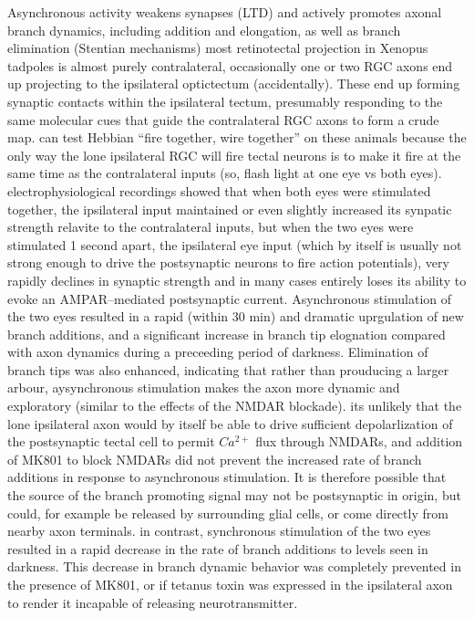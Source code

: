 \documentclass[11pt, a4paper, oneside]{article}   	%
\begin{document}
\begin{outline}
    \subpoint Asynchronous activity weakens synapses (LTD)  and actively promotes axonal branch dynamics, including addition and elongation, as well as branch elimination (Stentian mechanisms)
        \subsubpoint most retinotectal projection in Xenopus tadpoles is almost purely contralateral, occasionally one or two RGC axons end up projecting to the ipsilateral optictectum (accidentally). These end up forming synaptic contacts within the ipsilateral tectum, presumably responding to the same molecular cues that guide the contralateral RGC axons to form a crude map.
        \subsubpoint can test Hebbian ``fire together, wire together'' on these animals  because the only way the lone ipsilateral RGC will fire tectal neurons is to make it fire at the same time as the contralateral inputs (so, flash light at one eye vs both eyes).
        \subsubpoint electrophysiological recordings showed that when both eyes were stimulated together, the ipsilateral input maintained or even slightly increased its synpatic strength relavite to the contralateral inputs, but when the two eyes were stimulated 1 second apart, the ipsilateral eye input (which by itself is usually not strong enough to drive the postsynaptic neurons to fire action potentials), very rapidly declines in synaptic strength and in many cases entirely loses its ability to evoke an AMPAR--mediated postsynaptic current.
        \subsubpoint Asynchronous stimulation of the two eyes resulted in a rapid (within 30 min) and dramatic uprgulation of new branch additions, and a significant increase in branch tip elognation compared with axon dynamics during a preceeding period of darkness. Elimination of branch tips was also enhanced, indicating that rather than prouducing a larger arbour, aysynchronous stimulation makes the axon more dynamic and exploratory (similar to the effects of the NMDAR blockade).
          \supersubpoint its unlikely that the lone ipsilateral axon would by itself be able to drive sufficient depolarlization of the postsynaptic tectal cell to permit $Ca^{2+}$ flux through NMDARs, and addition of MK801 to block NMDARs did not prevent the increased rate of branch additions in response to asynchronous stimulation. It is therefore possible that the source of the branch promoting signal may not be postsynaptic in origin, but could, for example be released by surrounding glial cells, or come directly from nearby axon terminals.
        \subsubpoint in contrast, synchronous stimulation of the two eyes resulted in a rapid decrease in the rate of branch additions to levels seen in darkness. This decrease in branch dynamic behavior was completely prevented in the presence of MK801, or if tetanus toxin was expressed in the ipsilateral axon to render it incapable of releasing neurotransmitter.

\end{outline}
\end{document}
